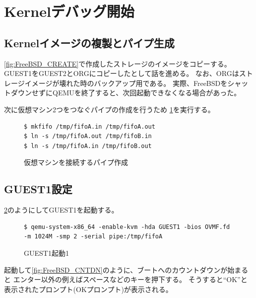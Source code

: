 \documentclass[a4j]{jarticle}
\begin{document}
\section{Kernelデバッグ開始}
\subsection{Kernelイメージの複製とパイプ生成}
\ref{fig:FreeBSD_CREATE}で作成したストレージのイメージをコピーする。
GUEST1をGUEST2とORGにコピーしたとして話を進める。
なお、ORGはストレージイメージが壊れた時のバックアップ用である。
実際、FreeBSDをシャットダウンせずにQEMUを終了すると、次回起動できなくなる場合があった。

次に仮想マシン2つをつなぐパイプの作成を行うため
\ref{fig:FreeBSD_pipe}を実行する。
\begin{figure}[htbp]
	\centering
	\begin{lstlisting}[basicstyle=\ttfamily\footnotesize, frame=single, breaklines=true]
$ mkfifo /tmp/fifoA.in /tmp/fifoA.out
$ ln -s /tmp/fifoA.out /tmp/fifoB.in
$ ln -s /tmp/fifoA.in /tmp/fifoB.out
	\end{lstlisting}
	\caption{仮想マシンを接続するパイプ作成}
	\label{fig:FreeBSD_pipe}
\end{figure}

\subsection{GUEST1設定}
\ref{fig:FreeBSD_guest1}のようにしてGUEST1を起動する。
\begin{figure}[htbp]
	\centering
	\begin{lstlisting}[basicstyle=\ttfamily\footnotesize, frame=single, breaklines=true]
$ qemu-system-x86_64 -enable-kvm -hda GUEST1 -bios OVMF.fd -m 1024M -smp 2 -serial pipe:/tmp/fifoA
	\end{lstlisting}
	\caption{GUEST1起動1}
	\label{fig:FreeBSD_guest1}
\end{figure}

起動して\ref{fig:FreeBSD_CNTDN}のように、ブートへのカウントダウンが始まると
エンター以外の例えばスペースなどのキーを押下する。
そうすると``OK''と表示されたプロンプト(OKプロンプト)が表示される。
\end{document}
